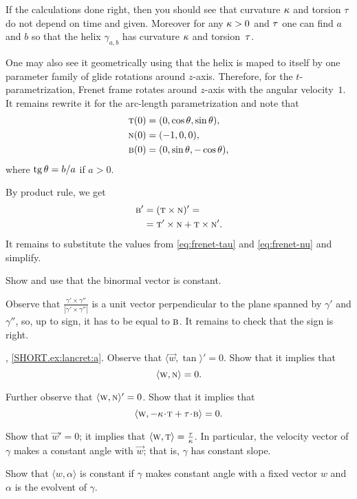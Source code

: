 If the calculations done right, then you should see that curvature $\kappa$ and torsion $\tau$ do not depend on time and given.
Moreover for any $\kappa>0$ and $\tau$ one can find $a$ and $b$ so that the helix $\gamma_{a,b}$ has curvature $\kappa$ and torsion~$\tau$.

One may also see it geometrically using that the helix is maped to itself by one parameter family of glide rotations around $z$-axis.
Therefore, for the $t$-parametrization, Frenet frame rotates around $z$-axis with the angular velocity~$1$.
It remains rewrite it for the arc-length parametrization and note that 
\begin{align*}
\textsc{t}(0)&=(0,\cos\theta, \sin\theta),
\\
\textsc{n}(0)&=(-1,0,0),
\\
\textsc{b}(0)&=(0,\sin\theta, -\cos\theta),
\end{align*}
where $\tg\theta\z=b/a$ if $a>0$. 

 By product rule, we get
\begin{align*}
\textsc{b}'&=(\textsc{t}\times \textsc{n})'=
\\
&=\textsc{t}'\times \textsc{n}+\textsc{t}\times\textsc{n}'.
\end{align*}
It remains to substitute the values from \ref{eq:frenet-tau} and \ref{eq:frenet-nu} and simplify.


Show and use that the binormal vector is constant.

 Observe that $\tfrac{\gamma'\times\gamma''}{|\gamma'\times\gamma''|}$ is a unit vector perpendicular to the plane spanned by $\gamma'$ and $\gamma''$, so, up to sign, it has to be equal to $\textsc{b}$.
It remains to check that the sign is right.

\parbf{\ref{ex:lancret}}, \ref{SHORT.ex:lancret:a}.
Observe that 
$\langle \vec w,\tan\rangle'=0$.
Show that it implies that
\[\langle \textsc w, \textsc{n}\rangle =0.\]

Further observe that 
$\langle \textsc w,\textsc{n}\rangle'=0$.
Show that it implies that 
\[\langle \vec w, -\kur\cdot\tan+\tor\cdot \bi\rangle =0.\]

Show that $\vec w'=0$;
it implies that $\langle \textsc w,\textsc{t}\rangle=\tfrac{\tau}{\kappa}$.
In particular, the velocity vector of $\gamma$ makes a constant angle with $\vec w$; that is, $\gamma$ has constant slope.

Show that $\langle w,\alpha\rangle$ is constant if $\gamma$ makes constant angle with a fixed vector $w$ and $\alpha$ is the evolvent of $\gamma$.

